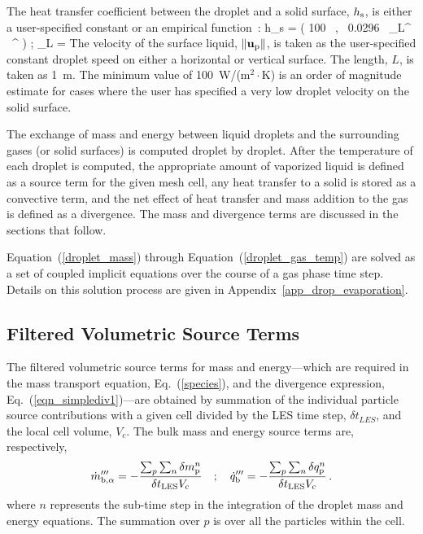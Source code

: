 The heat transfer coefficient between the droplet and a solid surface, $h_{\rm s}$, is either a user-specified constant or an empirical function~\cite{Incropera:1}:
\be
   h_{\rm s} = \max \left( 100 \, , \, 0.0296 \, \RE_L^{} \, \PR^\ot \;  \right)  \quad ; \quad \RE_L = 
\ee
The velocity of the surface liquid, $\| {\mathbf{u}}_{\rm p} \|$, is taken as the user-specified constant droplet speed on either a horizontal or vertical surface. The length, $L$, is taken as 1~m. The minimum value of 100~W/(m$^2 \cdot$K) is an order of magnitude estimate for cases where the user has specified a very low droplet velocity on the solid surface.

The exchange of mass and energy between liquid droplets and the surrounding gases (or solid surfaces) is computed droplet by droplet. After the temperature of each droplet is computed, the
appropriate amount of vaporized liquid is defined as a source term for the given mesh cell, any heat transfer to a solid is stored as a convective term, and the net effect of heat transfer and mass addition to the gas is defined as a divergence. The mass and divergence terms are discussed in the sections that follow.

Equation~(\ref{droplet_mass}) through Equation~(\ref{droplet_gas_temp}) are solved as a set of coupled implicit equations over the course of a gas phase time step. Details on this solution process are given in Appendix~\ref{app_drop_evaporation}.

\subsection{Filtered Volumetric Source Terms}

The filtered volumetric source terms for mass and energy---which are required in the mass transport equation, Eq.~(\ref{species}), and the divergence expression, Eq.~(\ref{eqn_simplediv1})---are obtained by summation of the individual particle source contributions with a given cell divided by the LES time step, $\delta t_{\si{LES}}$, and the local cell volume, $V_{\si{c}}$. The bulk mass and energy source terms are, respectively,
\begin{equation}
\label{eq:bulk_source}
\dot{m}_{{\rm b},\alpha}^{\ppp} = - \frac{ \sum_p \sum_n \delta m_{\si{p}}^n }{\delta t_{\si{LES}} V_{\si{c}}} \quad ; \quad
\dot{q}_{\rm b}^{\ppp} = - \frac{ \sum_p \sum_n \delta q_{\si{p}}^n }{\delta t_{\si{LES}} V_{\si{c}}} \,\mbox{.}
\end{equation}
where $n$ represents the sub-time step in the integration of the droplet mass and energy equations.  The summation over $p$ is over all the particles within the cell.

